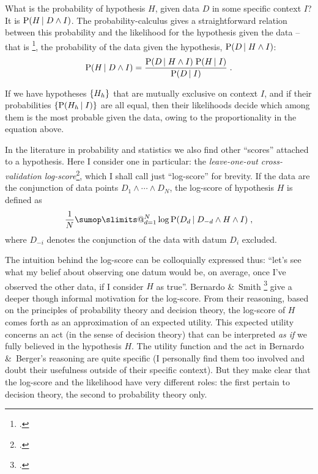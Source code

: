 \documentclass[\ifafour a4paper,12pt,\else a5paper,10pt,\fi%
onecolumn,oneside,article,%
british%
]{memoir}
\makeatletter
\theoremstyle{remark}
\theoremstyle{innote}
\def\sum{\DOTSI\sumop\slimits@}
\newcommand*{\citep}{\footcites}
\newcommand*{\amp}{\&}
\DeclarePairedDelimiter\set{\{}{\}}
\newcommand*{\p}{\mathrm{P}}%
\renewcommand*{\|}[1][]{\nonscript\,#1\vert\nonscript\;\mathopen{}}
\newcommand*{\sect}{\S}%
\newcommand*{\sects}{\S\S}%
\newcommand*{\yK}{I}
\makeatother
\begin{document}
What is the probability of hypothesis $H$, given data $D$ in some specific
context $\yK$? \; It is $\p(H \| D \land \yK)$. The probability-calculus
gives a straightforward relation between this probability and the
likelihood for the hypothesis given the data -- that is \citep[\sect~6.1
p.~62]{good1950}, the probability of the data given the hypothesis,
$\p(D \| H \land \yK)$:
\begin{equation}
  \label{eq:posterior_hypothesis_universal}
  \p(H \| D \land \yK) = \frac{\p(D \| H \land \yK)\;\p(H \| \yK)}{\p(D \| \yK)} \;.
\end{equation}

If we have hypotheses $\set{H_{h}}$ that are mutually exclusive on context
$\yK$, and if their probabilities $\set{\p(H_{h} \| \yK)}$ are all equal,
then their likelihoods decide which among them is the most probable given
the data, owing to the proportionality in the equation above.

In the literature in probability and statistics we also find other
\enquote{scores} attached to a hypothesis. Here I consider one in
particular: the \emph{leave-one-out cross-validation
  log-score}\citep[\sects~3.4, 6.1.6]{bernardoetal1994_r2000}[see
also][]{stone1977,geisseretal1979,vehtarietal2012,vehtarietal2002,krnjajicetal2011,krnjajicetal2014,gelmanetal2014,gronauetal2019,chandramoulietal2019},
which I shall call just \enquote{log-score} for brevity. If the data are
the conjunction of data points $D_{1} \land \dotsb \land D_{N}$, the
log-score of hypothesis $H$ is defined as
\begin{equation}
  \label{eq:log-score}
  \frac{1}{N} \sum_{d=1}^{N} \log\p(D_{d} \| D_{-d} \land H \land \yK) \;,
\end{equation}
where $D_{-i}$ denotes the conjunction of the data with datum $D_{i}$
excluded.

The intuition behind the log-score can be colloquially expressed thus:
\enquote{let's see what my belief about observing one datum would be, on
  average, once I've observed the other data, if I consider $H$ as true}.
Bernardo \amp\ Smith \citep[\sect~6.1.6]{bernardoetal1994_r2000} give a
deeper though informal motivation for the log-score. From their reasoning,
based on the principles of probability theory and decision theory, the
log-score of $H$ comes forth as an approximation of an expected utility.
This expected utility concerns an act (in the sense of decision theory)
that can be interpreted \emph{as if} we fully believed in the hypothesis
$H$. The utility function and the act in Bernardo \amp\ Berger's reasoning
are quite specific (I personally find them too involved and doubt their
usefulness outside of their specific context). But they make clear that the
log-score and the likelihood have very different roles: the first pertain
to decision theory, the second to probability theory only.
\end{document}
